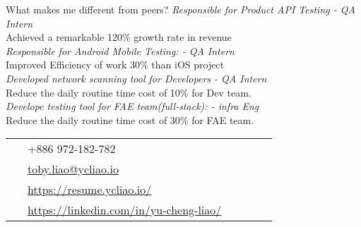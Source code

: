 \documentclass[10pt]{article} %
\begin{document}
\begin{paracol}{2}
\longformdescription
{What makes me different from peers?}
{
	\textit{Responsible for Product API Testing - QA Intern} \\
	Achieved a remarkable 120\% growth rate in revenue \\
	\textit{Responsible for Android Mobile Testing: - QA Intern} \\
	Improved Efficiency of work 30\% than iOS project \\
	\textit{Developed network scanning tool for Developers - QA Intern} \\
	Reduce the daily routine time cost of 10\% for Dev team. \\
	\textit{Develope testing tool for FAE team(full-stack): - infra Eng} \\
	Reduce the daily routine time cost of 30\% for FAE team.
}

\vspace{-\baselineskip}\bigskip\bigskip\bigskip\bigskip %


\switchcolumn %


\parbox[top][0.12\textheight][c]{\linewidth}{ %
	\vspace{-0.04\textheight} %
	\colorbox{shade}{ %
		\begin{supertabular}{p{0.05\linewidth}|p{0.775\linewidth}} %
			\raisebox{-1pt}{\faPhone} & +886 972-182-782 \\ %
			\raisebox{0pt}{\small\faEnvelope} & \href{mailto:toby.liao@ycliao.io}{toby.liao@ycliao.io} \\ %
			\raisebox{-1pt}{\small\faDesktop} & \href{https://resume.ycliao.io/}{https://resume.ycliao.io/} \\ %
			\raisebox{-1pt}{\faLinkedinSquare} & \href{https://linkedin.com/in/yu-cheng-liao/}{https://linkedin.com/in/yu-cheng-liao/} \\ %
		\end{supertabular}
	}
}



\end{paracol}
\end{document}
